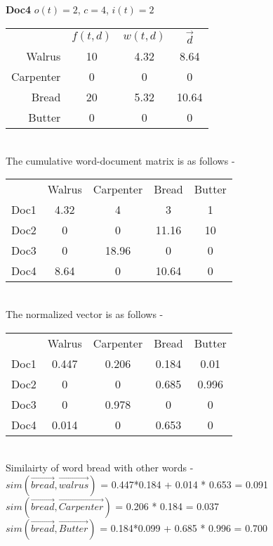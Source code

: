 \documentclass{article}
\begin{document}
\textbf{Doc4}
$o(t) = 2$, $c = 4$, $i(t) = 2$

\begin{tabular}{ r|c|c|c| }
\multicolumn{1}{r}{}
 & \multicolumn{1}{c}{$f(t,d)$}
 & \multicolumn{1}{c}{$w(t,d)$}
 & \multicolumn{1}{c}{$\vec{d}$} \\
\cline{2-4}
Walrus & 10 & 4.32 & 8.64 \\
\cline{2-4}
Carpenter & 0 & 0 & 0 \\
\cline{2-4}
Bread & 20 & 5.32 & 10.64 \\
\cline{2-4}
Butter & 0 & 0 & 0 \\
\cline{2-4}
\end{tabular} \\

The cumulative word-document matrix is as follows - \\


\begin{tabular}{ r|c|c|c|c| }
\multicolumn{1}{r}{}
 & \multicolumn{1}{c}{Walrus}
 & \multicolumn{1}{c}{Carpenter}
 & \multicolumn{1}{c}{Bread}
 & \multicolumn{1}{c}{Butter} \\
\cline{2-5}
Doc1 & 4.32 & 4 & 3 & 1 \\
\cline{2-5}
Doc2 & 0 & 0 & 11.16 & 10 \\
\cline{2-5}
Doc3 & 0 & 18.96 & 0 & 0 \\
\cline{2-5}
Doc4 & 8.64 & 0 & 10.64 & 0 \\
\cline{2-5}
\end{tabular} \\

The normalized vector is as follows - \\

\begin{tabular}{ r|c|c|c|c| }
\multicolumn{1}{r}{}
 & \multicolumn{1}{c}{Walrus}
 & \multicolumn{1}{c}{Carpenter}
 & \multicolumn{1}{c}{Bread}
 & \multicolumn{1}{c}{Butter} \\
\cline{2-5}
Doc1 & 0.447 & 0.206 & 0.184 & 0.01 \\
\cline{2-5}
Doc2 & 0 & 0 & 0.685 & 0.996 \\
\cline{2-5}
Doc3 & 0 & 0.978 & 0 & 0 \\
\cline{2-5}
Doc4 & 0.014 & 0 & 0.653 & 0 \\
\cline{2-5}
\end{tabular} \\

Similairty of word bread with other words - \\ 
$sim(\vec{bread},\vec{walrus})$ = 0.447*0.184 + 0.014 * 0.653 = 0.091 \\ 
$sim(\vec{bread},\vec{Carpenter})$ = 0.206 * 0.184 = 0.037 \\
$sim(\vec{bread},\vec{Butter})$ = 0.184*0.099 + 0.685 * 0.996 = 0.700 \\
\end{document}

